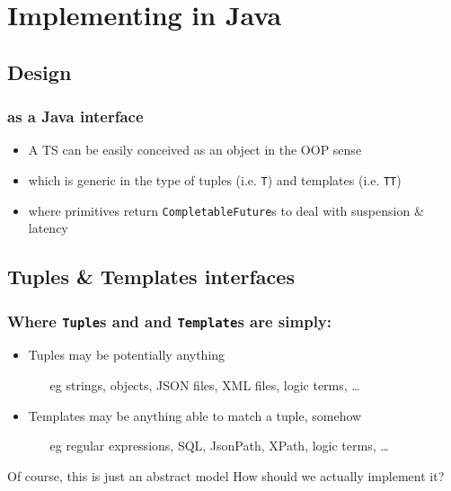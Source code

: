 \documentclass[presentation]{beamer}\mode<presentation>{\usetheme{AMSCesenaPurpleAndGold}}
\begin{document}
\section{Implementing \linda{} in Java}

\subsection{Design} 

\begin{frame}%
\frametitle{\linda{} as a Java interface}

\begin{itemize}
	\item A TS can be easily conceived as an \alert{object} in the OOP sense
	
	\vfill
	
	\item which is generic in the type of tuples (i.e. \texttt{\alert{T}}) and templates (i.e. \texttt{\alert{TT}})
	
	\vfill
	
	\item where primitives return \alert{\texttt{CompletableFuture}s} to deal with suspension \& latency
\end{itemize}

\vfill


\end{frame}

\subsection{Tuples \& Templates interfaces} 

\begin{frame}%
\frametitle{Where \texttt{Tuple}s and and \texttt{Template}s are simply:}

\columnsHH{

}{

}

\begin{itemize}
\item Tuples may be potentially anything
%
\begin{itemize}
	\item[eg] strings, objects, JSON files, XML files, logic terms, \ldots
\end{itemize}

\item Templates may be anything able to match a tuple, somehow
%
\begin{itemize}
	\item[eg] regular expressions, SQL, JsonPath, XPath, logic terms, \ldots
\end{itemize}
\end{itemize}

\vfill

\begin{block}{Of course, this is just an abstract model}
How should we \alert{actually} implement it?
\end{block}

\end{frame}
\end{document}
